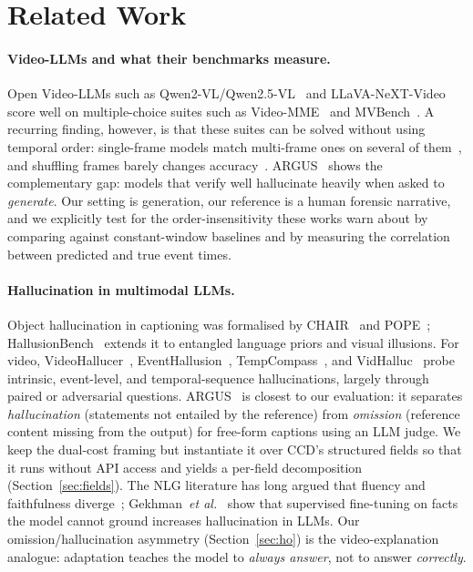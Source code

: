 \section{Related Work}
\label{sec:related}

\paragraph{Video-LLMs and what their benchmarks measure.}
Open Video-LLMs such as Qwen2-VL/Qwen2.5-VL~\cite{qwen2vl,qwen25vl} and LLaVA-NeXT-Video~\cite{llavanextvideo} score well on multiple-choice suites such as Video-MME~\cite{videomme} and MVBench~\cite{mvbench}.
A recurring finding, however, is that these suites can be solved without using temporal order: single-frame models match multi-frame ones on several of them~\cite{buch2022revisiting,lei2023singleframe}, and shuffling frames barely changes accuracy~\cite{tvbench}.
ARGUS~\cite{argus2025} shows the complementary gap: models that verify well hallucinate heavily when asked to \emph{generate}.
Our setting is generation, our reference is a human forensic narrative, and we explicitly test for the order-insensitivity these works warn about by comparing against constant-window baselines and by measuring the correlation between predicted and true event times.

\paragraph{Hallucination in multimodal LLMs.}
Object hallucination in captioning was formalised by CHAIR~\cite{rohrbach2018chair} and POPE~\cite{pope}; HallusionBench~\cite{hallusionbench} extends it to entangled language priors and visual illusions.
For video, VideoHallucer~\cite{videohallucer}, EventHallusion~\cite{eventhallusion}, TempCompass~\cite{tempcompass}, and VidHalluc~\cite{vidhalluc} probe intrinsic, event-level, and temporal-sequence hallucinations, largely through paired or adversarial questions.
ARGUS~\cite{argus2025} is closest to our evaluation: it separates \emph{hallucination} (statements not entailed by the reference) from \emph{omission} (reference content missing from the output) for free-form captions using an LLM judge.
We keep the dual-cost framing but instantiate it over CCD's structured fields so that it runs without API access and yields a per-field decomposition (Section~\ref{sec:fields}).
The NLG literature has long argued that fluency and faithfulness diverge~\cite{maynez2020faithfulness,ji2023survey}; Gekhman~\emph{et al.}~\cite{gekhman2024finetuning} show that supervised fine-tuning on facts the model cannot ground increases hallucination in LLMs.
Our omission/hallucination asymmetry (Section~\ref{sec:ho}) is the video-explanation analogue: adaptation teaches the model to \emph{always answer}, not to answer \emph{correctly}.

